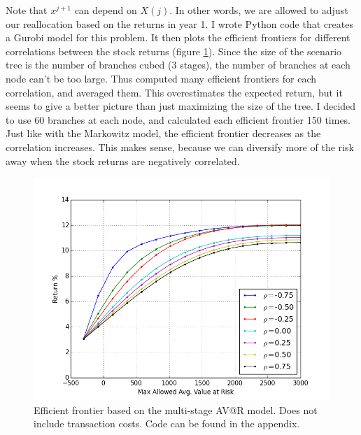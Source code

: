 \documentclass{amsart}
\theoremstyle{definition}
\theoremstyle{remark}
\begin{document}
Note that $x^{j+1}$ can depend on $X(j)$. In other words, we are allowed to adjust our reallocation based on the returns in year 1. I wrote Python code that creates a Gurobi model for this problem. It then plots the efficient frontiers for different correlations between the stock returns (figure \ref{fig:multi_stage_no_transaction_costs}). Since the size of the scenario tree is the number of branches cubed (3 stages), the number of branches at each node can't be too large. Thus computed many efficient frontiers for each correlation, and averaged them. This overestimates the expected return, but it seems to give a better picture than just maximizing the size of the tree. I decided to use 60 branches at each node, and calculated each efficient frontier 150 times.
Just like with the Markowitz model, the efficient frontier decreases as the correlation increases. This makes sense, because we can diversify more of the risk away when the stock returns are negatively correlated.
\begin{figure}
\centering
\includegraphics[scale=0.5]{multi_stage_no_transaction_costs.png}
\caption{Efficient frontier based on the multi-stage AV@R model. Does not include transaction costs.  Code can be found in the appendix.}
\label{fig:multi_stage_no_transaction_costs}
\end{figure}
\end{document}
